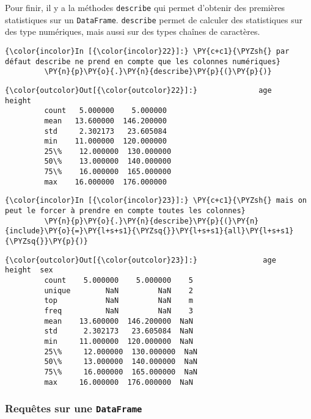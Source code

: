     Pour finir, il y a la méthodes \texttt{describe} qui permet d'obtenir
des premières statistiques sur un \texttt{DataFrame}. \texttt{describe}
permet de calculer des statistiques sur des type numériques, mais aussi
sur des types chaînes de caractères.

    \begin{Verbatim}[commandchars=\\\{\}]
{\color{incolor}In [{\color{incolor}22}]:} \PY{c+c1}{\PYZsh{} par défaut describe ne prend en compte que les colonnes numériques}
         \PY{n}{p}\PY{o}{.}\PY{n}{describe}\PY{p}{(}\PY{p}{)}
\end{Verbatim}


\begin{Verbatim}[commandchars=\\\{\}]
{\color{outcolor}Out[{\color{outcolor}22}]:}              age      height
         count   5.000000    5.000000
         mean   13.600000  146.200000
         std     2.302173   23.605084
         min    11.000000  120.000000
         25\%    12.000000  130.000000
         50\%    13.000000  140.000000
         75\%    16.000000  165.000000
         max    16.000000  176.000000
\end{Verbatim}
            
    \begin{Verbatim}[commandchars=\\\{\}]
{\color{incolor}In [{\color{incolor}23}]:} \PY{c+c1}{\PYZsh{} mais on peut le forcer à prendre en compte toutes les colonnes}
         \PY{n}{p}\PY{o}{.}\PY{n}{describe}\PY{p}{(}\PY{n}{include}\PY{o}{=}\PY{l+s+s1}{\PYZsq{}}\PY{l+s+s1}{all}\PY{l+s+s1}{\PYZsq{}}\PY{p}{)}
\end{Verbatim}


\begin{Verbatim}[commandchars=\\\{\}]
{\color{outcolor}Out[{\color{outcolor}23}]:}               age      height  sex
         count    5.000000    5.000000    5
         unique        NaN         NaN    2
         top           NaN         NaN    m
         freq          NaN         NaN    3
         mean    13.600000  146.200000  NaN
         std      2.302173   23.605084  NaN
         min     11.000000  120.000000  NaN
         25\%     12.000000  130.000000  NaN
         50\%     13.000000  140.000000  NaN
         75\%     16.000000  165.000000  NaN
         max     16.000000  176.000000  NaN
\end{Verbatim}
            
    \hypertarget{requuxeates-sur-une-dataframe}{%
\subsubsection{\texorpdfstring{Requêtes sur une
\texttt{DataFrame}}{Requêtes sur une DataFrame}}\label{requuxeates-sur-une-dataframe}}


